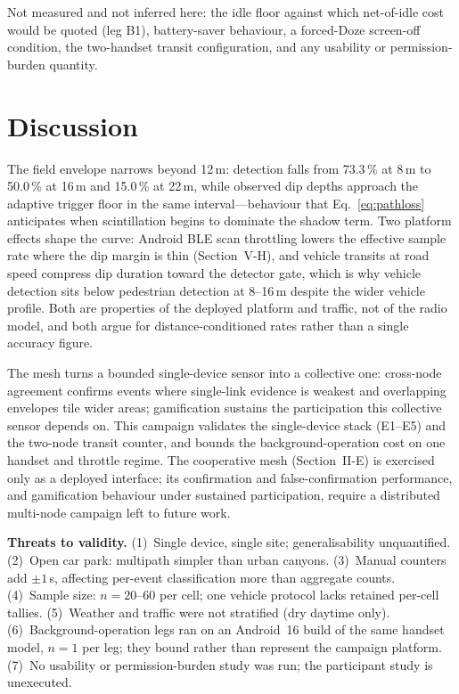 \documentclass[journal,10pt]{IEEEtran}
\begin{document}
Not measured and not inferred here: the idle floor against which net-of-idle
cost would be quoted (leg B1), battery-saver behaviour, a forced-Doze screen-off
condition, the two-handset transit configuration, and any usability or
permission-burden quantity.

\section{Discussion}
The field envelope narrows beyond 12\,m: detection falls from 73.3\,\% at
8\,m to 50.0\,\% at 16\,m and 15.0\,\% at 22\,m, while observed dip depths
approach the adaptive trigger floor in the same interval---behaviour that
Eq.~\eqref{eq:pathloss} anticipates when scintillation begins to dominate the
shadow term. Two platform effects shape the curve: Android BLE scan throttling
lowers the effective sample rate where the dip margin is thin (Section~V-H),
and vehicle transits at road speed compress dip duration toward the detector
gate, which is why vehicle detection sits below pedestrian detection at
8--16\,m despite the wider vehicle profile. Both are properties of the
deployed platform and traffic, not of the radio model, and both argue for
distance-conditioned rates rather than a single accuracy figure.

The mesh turns a bounded single-device sensor into a collective one:
cross-node agreement confirms events where single-link evidence is weakest and
overlapping envelopes tile wider areas; gamification sustains the participation
this collective sensor depends on. This campaign validates the single-device
stack (E1--E5) and the two-node transit counter, and bounds the
background-operation cost on one handset and throttle regime. The cooperative
mesh (Section~II-E) is exercised only as a deployed interface; its confirmation
and false-confirmation performance, and gamification behaviour under sustained
participation, require a distributed multi-node campaign left to future work.

\textbf{Threats to validity.} (1)~Single device, single site; generalisability
unquantified. (2)~Open car park: multipath simpler than urban canyons.
(3)~Manual counters add $\pm1$\,s, affecting per-event classification more than
aggregate counts. (4)~Sample size: $n = 20$--$60$ per cell; one vehicle
protocol lacks retained per-cell tallies. (5)~Weather and traffic were not
stratified (dry daytime only). (6)~Background-operation legs ran on an
Android~16 build of the same handset model, $n=1$ per leg; they bound rather
than represent the campaign platform. (7)~No usability or permission-burden
study was run; the participant study is unexecuted.
\end{document}
